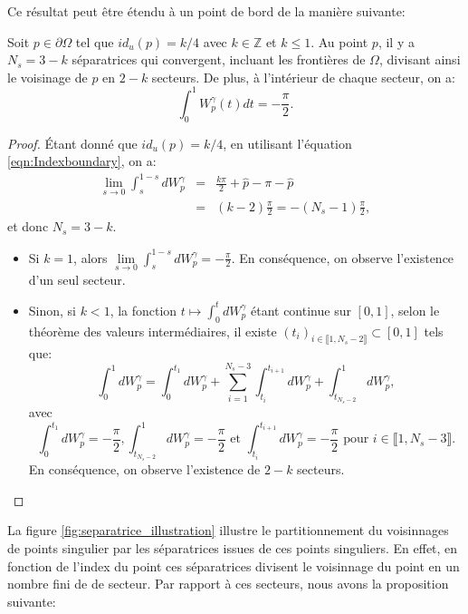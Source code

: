 Ce résultat peut être étendu à un point de bord de la manière suivante:

\begin{proposition}
\label{prop:align_sepa_voisinnage_bord}
Soit $p\in\partial\Omega$ tel que $id_u(p)=k/4$ avec $k\in\mathbb{Z}$ et $k\leq 1$. Au point $p$, il y a $N_s=3-k$ séparatrices qui convergent, incluant les frontières de $\Omega$, divisant ainsi le voisinage de $p$ en $2-k$ secteurs. De plus, à l'intérieur de chaque secteur, on a:
$$\int_0^1W_p^\gamma(t)dt=-\frac{\pi}{2}.$$
\end{proposition}

\begin{proof}
Étant donné que $id_u(p)=k/4$, en utilisant l'équation \eqref{eqn:Indexboundary}, on a:
\begin{eqnarray*}
    \lim\limits_{s\rightarrow 0}\displaystyle\int_s^{1-s} dW_p^\gamma&=&\frac{k\pi}{2}+\hat{p}-\pi-\hat{p}\\
    &=&(k-2)\frac{\pi}{2}=-(N_s-1)\frac{\pi}{2},
\end{eqnarray*}
et donc $N_s=3-k$.
\begin{itemize}
\item Si $k=1$, alors $\lim\limits_{s\rightarrow 0}\displaystyle\int_s^{1-s} dW_p^\gamma= -\frac{\pi}{2}$. En conséquence, on observe l'existence d'un seul secteur.\vspace{0.1cm}
\item Sinon, si $k<1$, la fonction $t\longmapsto\displaystyle\int_{0}^t dW_p^\gamma$ étant continue sur $[0,1]$, selon le théorème des valeurs intermédiaires, il existe $(t_i)_{i\in\llbracket 1, N_s-2\rrbracket}\subset[0, 1]$ tels que:
$$\displaystyle\int_{0}^{1} dW_p^\gamma= \displaystyle\int_{0}^{t_1} dW_p^\gamma+\sum_{i=1}^{N_s-3}\displaystyle\int_{t_i}^{t_{i+1}} dW_p^\gamma+\displaystyle\int_{t_{N_s-2}}^{1} dW_p^\gamma,$$
avec
$$\displaystyle\int_{0}^{t_1} dW_p^\gamma=-\frac{\pi}{2},\displaystyle\int_{t_{N_s-2}}^{1} dW_p^\gamma=-\frac{\pi}{2}\mbox{ et }\displaystyle\int_{t_i}^{t_{i+1}} dW_p^\gamma=-\frac{\pi}{2}\mbox{ pour }i\in\llbracket 1, N_s-3\rrbracket.$$
En conséquence, on observe l'existence de $2-k$ secteurs.
\end{itemize}
\end{proof}
La figure \ref{fig:separatrice_illustration} illustre le partitionnement du voisinnages de points singulier par les séparatrices issues de ces points singuliers. En effet, en fonction de l'index du point ces séparatrices divisent le voisinnage du point en un nombre fini de de secteur. Par rapport à ces secteurs, nous avons la proposition suivante:
